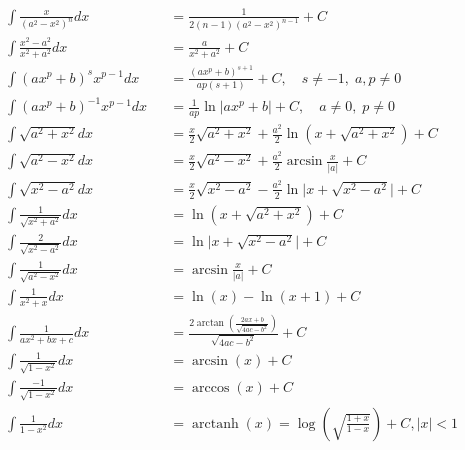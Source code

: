 \begin{footnotesize}
\begin{align*}
         & \int \frac{x}{{(a^2-x^2)}^n}dx        &  & =\frac{1}{2(n-1){(a^2-x^2)}^{n-1}}+C                                              \\
         & \int \frac{x^2-a^2}{x^2+a^2}dx        &  & =\frac{a}{x^2+a^2}+C                                                              \\
         & \int {(ax^p+b)}^s x^{p-1}dx           &  & =\frac{{(ax^p+b)}^{s+1}}{ap(s+1)}+C,\quad s\neq -1,\; a, p\neq 0                  \\
         & \int {(ax^p+b)}^{-1}x^{p-1}dx         &  & =\frac{1}{ap}\ln\vert ax^p+b\vert +C,\quad a\neq 0,\; p\neq 0                     \\
         & \int \sqrt{a^2+x^2}dx                 &  & =\frac{x}{2}\sqrt{a^2+x^2}+\frac{a^2}{2}\ln(x+\sqrt{a^2+x^2})+C                   \\
         & \int \sqrt{a^2-x^2}dx                 &  & =\frac{x}{2}\sqrt{a^2-x^2}+\frac{a^2}{2}\arcsin\frac{x}{\vert a \vert}+C          \\
         & \int \sqrt{x^2-a^2}dx                 &  & =\frac{x}{2}\sqrt{x^2-a^2}-\frac{a^2}{2}\ln\big\vert x+\sqrt{x^2-a^2}\big\vert +C \\
         & \int \frac{1}{\sqrt{x^2+a^2}}dx       &  & =\ln(x+\sqrt{a^2+x^2})+C                                                          \\
         & \int \frac{2}{\sqrt{x^2-a^2}}dx       &  & =\ln\vert x+\sqrt{x^2-a^2}\vert +C                                                \\
         & \int \frac{1}{\sqrt{a^2-x^2}}dx       &  & =\arcsin\frac{x}{\vert a\vert }+C                                                 \\
         & \int \frac{1}{x^2+x}dx                &  & =\ln(x)-\ln(x+1)+C                                                                \\
         & \int \frac{1}{ax^2+bx+c}dx            &  & =\frac{2\arctan(\frac{2ax+b}{\sqrt{4ac-b^2}})}{\sqrt{4ac-b^2}}+C                  \\
         & \int \frac{1}{\sqrt{1-x^2}}dx         &  & =\arcsin(x)+C                                                                     \\
         & \int \frac{-1}{\sqrt{1-x^2}}dx        &  & =\arccos(x)+C                                                                     \\
         & \int \frac{1}{1-x^2}dx                &  & =\operatorname{arctanh}(x)=\log(\sqrt{\frac{1+x}{1-x}})+C, \vert x \vert < 1      \\

\end{align*}
\end{footnotesize}

